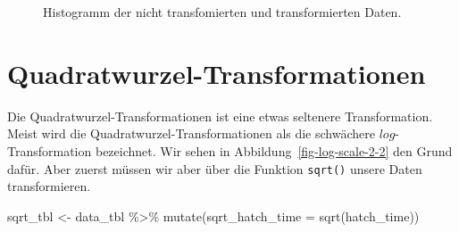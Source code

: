 \documentclass[
  letterpaper,
]{scrbook}
\newenvironment{Shaded}{\begin{snugshade}}{\end{snugshade}}
\newcommand{\AttributeTok}[1]{\textcolor[rgb]{0.40,0.45,0.13}{#1}}
\newcommand{\FunctionTok}[1]{\textcolor[rgb]{0.28,0.35,0.67}{#1}}
\newcommand{\NormalTok}[1]{\textcolor[rgb]{0.00,0.23,0.31}{#1}}
\newcommand{\OtherTok}[1]{\textcolor[rgb]{0.00,0.23,0.31}{#1}}
\newcommand{\SpecialCharTok}[1]{\textcolor[rgb]{0.37,0.37,0.37}{#1}}
\begin{document}
\begin{figure}

\begin{minipage}[t]{0.50\linewidth}

{\centering 


}

\end{minipage}%
%
\begin{minipage}[t]{0.50\linewidth}

{\centering 


}

\end{minipage}%

\caption{\label{fig-log-scale-1}Histogramm der nicht transfomierten und
transformierten Daten.}

\end{figure}

\hypertarget{quadratwurzel-transformationen}{%
\section{Quadratwurzel-Transformationen}\label{quadratwurzel-transformationen}}

Die Quadratwurzel-Transformationen ist eine etwas seltenere
Transformation. Meist wird die Quadratwurzel-Transformationen als die
schwächere \(log\)-Transformation bezeichnet. Wir sehen in
Abbildung~\ref{fig-log-scale-2-2} den Grund dafür. Aber zuerst müssen
wir aber über die Funktion \texttt{sqrt()} unsere Daten transformieren.

\begin{Shaded}
\begin{Highlighting}[]
\NormalTok{sqrt\_tbl }\OtherTok{\textless{}{-}}\NormalTok{ data\_tbl }\SpecialCharTok{\%\textgreater{}\%} 
  \FunctionTok{mutate}\NormalTok{(}\AttributeTok{sqrt\_hatch\_time =} \FunctionTok{sqrt}\NormalTok{(hatch\_time))}
\end{Highlighting}
\end{Shaded}
\end{document}
